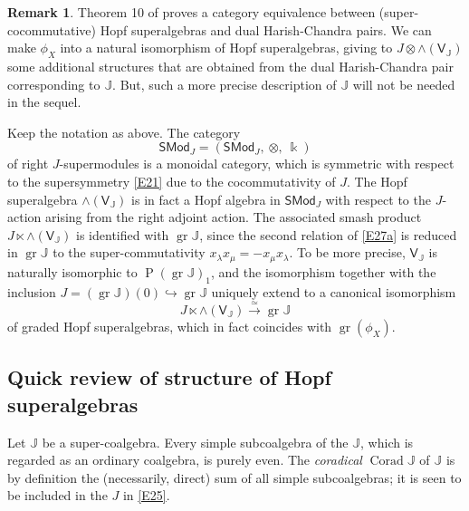 \documentclass[11pt, a4paper]{amsart}
\theoremstyle{definition}
\newtheorem{rem}[theorem]{Remark}
\numberwithin{equation}{section}
\begin{document}
\begin{rem}\label{R21}
Theorem 10 of \cite{M3} proves a category equivalence between (super-cocommutative) Hopf superalgebras
and dual Harish-Chandra pairs. We can make $\phi_X$ into a natural isomorphism of Hopf superalgebras, 
giving to $J \otimes \wedge(\mathsf{V}_{\mathbb{J}})$ some additional structures that are obtained from
the dual Harish-Chandra pair corresponding to $\mathbb{J}$. But, such a
more precise description of $\mathbb{J}$ will not be needed in the sequel. 
\end{rem}

Keep the notation as above. The category 
\[ \mathsf{SMod}_{J} = (\mathsf{SMod}_{J},\ \otimes,\ \Bbbk) \]
of right $J$-supermodules is a monoidal category, which is symmetric with respect to the supersymmetry \eqref{E21}
due to the cocommutativity of $J$.
The Hopf superalgebra $\wedge(\mathsf{V}_{\mathbb{J}})$ is in fact a Hopf algebra in $\mathsf{SMod}_{J}$ with respect to the $J$-action arising from the right adjoint action.
The associated smash product $J \ltimes \wedge(\mathsf{V}_{\mathbb{J}})$ is identified with $\operatorname{gr}\mathbb{J}$, since the second relation of \eqref{E27a} is reduced in $\operatorname{gr}\mathbb{J}$ to the super-commutativity $x_{\lambda}x_{\mu} = -x_{\mu}x_{\lambda}$.
To be more precise, $\mathsf{V}_{\mathbb{J}}$ is naturally isomorphic to $\operatorname{P}(\operatorname{gr}\mathbb{J})_{1}$, and the isomorphism together with the inclusion $J = (\operatorname{gr}\mathbb{J})(0) \hookrightarrow \operatorname{gr}\mathbb{J}$ uniquely extend to a canonical isomorphism
\begin{equation}\label{E29}
J \ltimes \wedge(\mathsf{V}_{\mathbb{J}}) \overset{\simeq}{\longrightarrow} \operatorname{gr}\mathbb{J}
\end{equation}
of graded Hopf superalgebras, which in fact coincides with $\operatorname{gr}(\phi_{X})$.

\subsection{Quick review of structure of Hopf superalgebras}\label{Subsec2.5}
Let $\mathbb{J}$ be a super-coalgebra. 
Every simple subcoalgebra of the $\mathbb{J}$, which is regarded as an ordinary coalgebra, is purely even.
The \emph{coradical} $\operatorname{Corad}\mathbb{J}$ of $\mathbb{J}$ is by definition the (necessarily, direct) sum of all simple subcoalgebras; it is seen to be included in the $J$ in \eqref{E25}.
\end{document}
